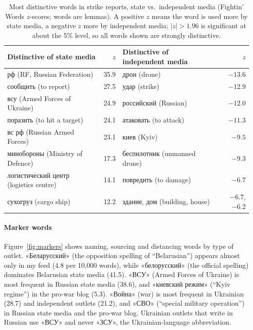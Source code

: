 \documentclass[11pt,a4paper]{article}
\newcommand{\ru}[2]{«#1» (#2)}
\begin{document}
\begin{table}[H]
\centering
\small
\caption{Most distinctive words in strike reports, state vs.\ independent media (Fightin' Words $z$-scores; words are lemmas). A positive $z$ means the word is used more by state media, a negative $z$ more by independent media; $|z|>1.96$ is significant at about the 5\% level, so all words shown are strongly distinctive.}
\label{tab:fw}
\begin{tabular}{lr@{\hspace{2.5em}}lr}
\toprule
Distinctive of state media & $z$ & Distinctive of independent media & $z$ \\
\midrule
рф (RF, Russian Federation) & 35.9 & дрон (drone) & $-13.6$ \\
сообщить (to report) & 27.5 & удар (strike) & $-12.9$ \\
всу (Armed Forces of Ukraine) & 24.9 & российский (Russian) & $-12.0$ \\
поразить (to hit a target) & 24.1 & атаковать (to attack) & $-11.3$ \\
вс рф (Russian Armed Forces) & 23.1 & киев (Kyiv) & $-9.5$ \\
минобороны (Ministry of Defence) & 17.3 & беспилотник (unmanned drone) & $-9.3$ \\
логистический центр (logistics centre) & 14.1 & повредить (to damage) & $-6.7$ \\
сухогруз (cargo ship) & 12.2 & здание, дом (building, house) & $-6.7$, $-6.2$ \\
\bottomrule
\end{tabular}
\end{table}

\paragraph{Marker words} Figure~\ref{fig:markers} shows naming, sourcing and distancing words by type of outlet. «Беларусский» (the opposition spelling of ``Belarusian'') appears almost only in my feed (4.8 per 10,000 words), while «белорусский» (the official spelling) dominates Belarusian state media (41.5). \ru{ВСУ}{Armed Forces of Ukraine} is most frequent in Russian state media (38.6), and \ru{киевский режим}{``Kyiv regime''} in the pro-war blog (5.3). \ru{Война}{war} is most frequent in Ukrainian (28.7) and independent outlets (21.2), and \ru{СВО}{``special military operation''} in Russian state media and the pro-war blog. Ukrainian outlets that write in Russian use «ВСУ» and never «ЗСУ», the Ukrainian-language abbreviation.
\end{document}
